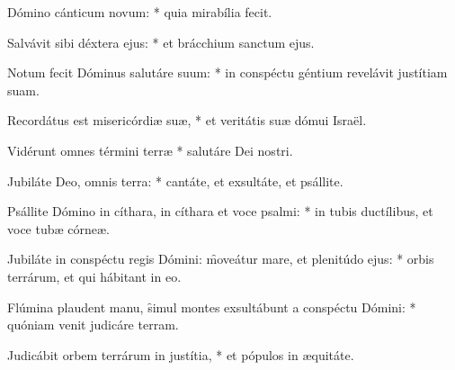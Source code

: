 \begin{psalmus}

     Dómino cánticum novum: * quia mirabília fecit.

    Salvávit sibi déxtera ejus: * et brácchium sanctum ejus.

    Notum fecit Dóminus salutáre suum: * in conspéctu géntium revelávit justítiam suam.

    Recordátus est misericórdiæ suæ, * et veritátis suæ dómui Israël.

    Vidérunt omnes términi terræ * salutáre Dei nostri.

    Jubiláte Deo, omnis terra: * cantáte, et exsultáte, et psállite.

    Psállite Dómino in cíthara, in cíthara et voce psalmi: * in tubis ductílibus, et voce tubæ córneæ.

    Jubiláte in conspéctu regis Dómini: \f moveátur mare, et plenitúdo ejus: * orbis terrárum, et qui hábitant in eo.

    Flúmina plaudent manu, \f simul montes exsultábunt a conspéctu Dómini: * quóniam venit judicáre terram.

    Judicábit orbem terrárum in justítia, * et pópulos in æquitáte.

\end{psalmus}
